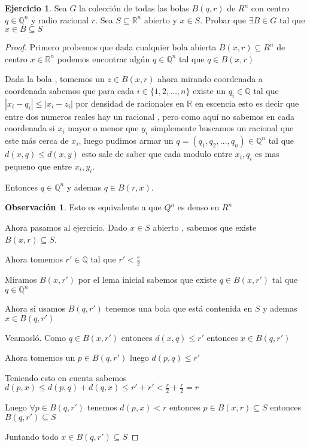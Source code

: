 \documentclass[12pt]{article}
\newcommand{\Q}{\mathbb{Q}}
\newcommand{\R}{\mathbb{R}}
\theoremstyle{definition}
\newtheorem*{remark}{Observación}
\newtheorem{ej}{Ejercicio}
\begin{document}
\begin{ej}
  Sea $G$ la colección de todas las bolas $B(q,r)$ de $R^n$ con centro $q \in \Q^n$ y radio racional $r$. Sea $S \subseteq \R^n$ abierto y $x \in S$. Probar que $\exists B \in G$ tal que $x \in B \subseteq S$

  \begin{proof}
  Primero probemos que dada cualquier bola abierta $B(x,r) \subseteq R^n$ de centro $x \in \R^n$ podemos encontrar algún $q \in \Q^n$ tal que $q \in B(x,r)$

  Dada la bola , tomemos un $z \in B(x,r)$ ahora mirando coordenada a coordenada sabemos que para cada $i \in \{1,2,\dots,n\}$ existe un $q_{i} \in \Q$ tal que  $|x_{i} - q_{i}| \leq |x_{i} - z_{i}| $ por densidad de racionales en $\R$ en escencia esto es decir que entre dos numeros reales hay un racional , pero como aquí no sabemos en cada coordenada si $x_{i}$ mayor o menor que $y_{i}$ simplemente buscamos un racional que este más cerca de $x_{i}$, luego pudimos armar un $q = (q_{1},q_{2}, \dots ,q_{n}) \in \Q^n$ tal que $d(x,q) \leq d(x,y)$ esto sale de saber que cada modulo entre $x_{i} , q_{i}$ es mas pequeno que entre $x_{i},y_{i}$. 

  Entonces $q \in \Q^n$ y ademas $q \in B(r,x)$. 
  \begin{remark}Esto es equivalente a que $Q^n$ es denso en $R^n$ \end{remark}

  Ahora pasamos al ejercicio. Dado $x \in S$ abierto , sabemos que existe $B(x,r) \subseteq S$. 

  Ahora tomemos $r' \in \Q$ tal que $r' < \frac{r}{2}$ 

  Miramos $B(x,r')$ por el lema inicial sabemos que existe $q \in B(x,r')$ tal que $q \in \Q^n$

  Ahora si usamos $B(q,r')$ tenemos una bola que está contenida en $S$ y ademas $x \in B(q,r')$

  Veamosló. Como $q \in B(x,r')$ entonces $d(x,q) \leq r'$ entonces $x \in B(q,r')$

  Ahora tomemos un $p \in B(q,r')$ luego $d(p,q) \leq r'$ 

  Teniendo esto en cuenta sabemos $d(p,x) \leq d(p,q) + d(q,x) \leq r' + r' < \frac{r}{2} + \frac{r}{2} = r$

  Luego $\forall p \in B(q,r')$ tenemos $d(p,x) < r$ entonces $p \in B(x,r) \subseteq S$ entonces $B(q,r') \subseteq S$

  Juntando todo $x \in B(q,r') \subseteq S$

\end{proof}
\end{ej}
\end{document}
